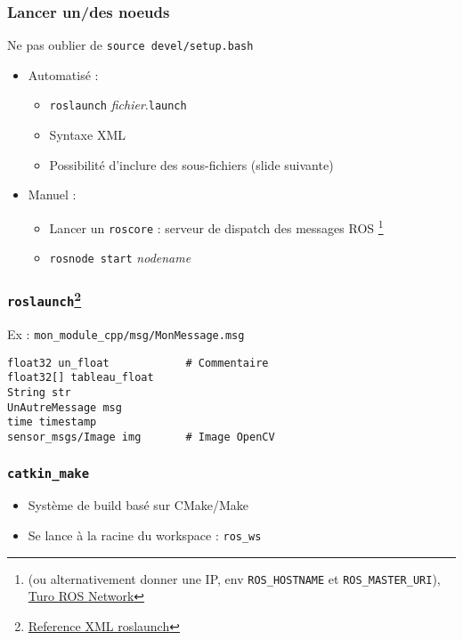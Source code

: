 \documentclass{beamer}
\begin{document}
\begin{frame}
\frametitle{Lancer un/des noeuds}
Ne pas oublier de \texttt{source devel/setup.bash}
\begin{itemize}
    \item Automatisé : \begin{itemize}
        \item \texttt{roslaunch} \textit{fichier}.\texttt{launch}
        \item Syntaxe XML
        \item Possibilité d'inclure des sous-fichiers (slide suivante)
    \end{itemize}
    \item Manuel : \begin{itemize}
        \item Lancer un \texttt{roscore} : serveur de dispatch des messages ROS \footnote{(ou
        alternativement donner une IP, env \texttt{ROS\_HOSTNAME} et \texttt{ROS\_MASTER\_URI}),
        \href{http://wiki.ros.org/ROS/NetworkSetup}{Turo ROS Network}}
        \item \texttt{rosnode start} \textit{nodename}
    \end{itemize}
\end{itemize}
\end{frame}

\begin{frame}[fragile]
\frametitle{\texttt{roslaunch}\footnote{\href{http://wiki.ros.org/roslaunch/XML
}{Reference XML roslaunch}}}
Ex : \texttt{mon\_module\_cpp/msg/MonMessage.msg}

\begin{verbatim}
float32 un_float            # Commentaire
float32[] tableau_float
String str
UnAutreMessage msg
time timestamp
sensor_msgs/Image img       # Image OpenCV
\end{verbatim}

\end{frame}


\begin{frame}
\frametitle{\texttt{catkin\_make}}
\begin{itemize}
    \item Système de build basé sur CMake/Make
    \item Se lance à la racine du workspace : \texttt{ros\_ws}
\end{itemize}
\end{frame}
    
\end{document}
